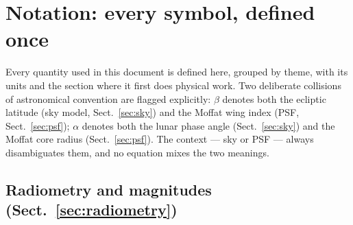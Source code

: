 \section{Notation: every symbol, defined once}
\label{sec:notation}

Every quantity used in this document is defined here, grouped by theme,
with its units and the section where it first does physical work.  Two
deliberate collisions of astronomical convention are flagged explicitly:
$\beta$ denotes both the ecliptic latitude (sky model,
Sect.~\ref{sec:sky}) and the Moffat wing index (PSF, Sect.~\ref{sec:psf});
$\alpha$ denotes both the lunar phase angle (Sect.~\ref{sec:sky}) and the
Moffat core radius (Sect.~\ref{sec:psf}).  The context — sky or PSF —
always disambiguates them, and no equation mixes the two meanings.

\subsection*{Radiometry and magnitudes (Sect.~\ref{sec:radiometry})}

